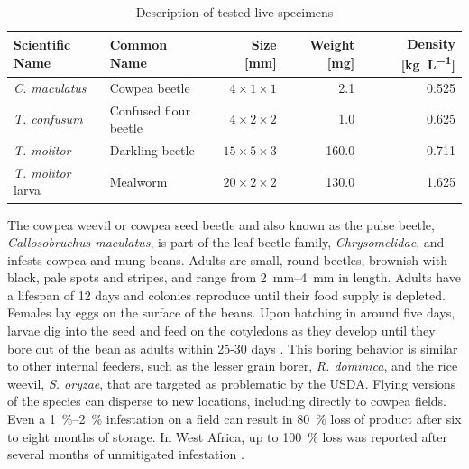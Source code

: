 \begin{table}[!htbp]
	\caption{Description of tested live specimens \label{tab:insects}}
	\centering
	\begin{tabular}{@{}llrrr@{}}
		\toprule
		\textbf{Scientific Name}  & \textbf{Common Name}  & \textbf{Size [\si{\milli\meter}]} & \textbf{Weight [\si{\milli\gram}]} & \textbf{Density [\si{\kilo\gram\per\liter}]} \\
		\midrule
		\textit{C. maculatus}     & Cowpea beetle         & \(4 \times 1 \times 1\)           & 2.1                                & 0.525                                        \\
		\textit{T. confusum}      & Confused flour beetle & \(4 \times 2 \times 2\)           & 1.0                                & 0.625                                        \\
		\textit{T. molitor}       & Darkling beetle       & \(15 \times 5 \times 3\)          & 160.0                              & 0.711                                        \\
		\textit{T. molitor} larva & Mealworm              & \(20 \times 2 \times 2\)          & 130.0                              & 1.625                                        \\
		\bottomrule
	\end{tabular}
\end{table}

The cowpea weevil or cowpea seed beetle and also known as the pulse beetle, \textit{Callosobruchus maculatus}, is part of the leaf beetle family, \textit{Chrysomelidae}, and infests cowpea and mung beans. Adults are small, round beetles, brownish with black, pale spots and stripes, and range from \SIrange{2}{4}{\milli\meter} in length. Adults have a lifespan of 12 days and colonies reproduce until their food supply is depleted. Females lay eggs on the surface of the beans. Upon hatching in around five days, larvae dig into the seed and feed on the cotyledons as they develop until they bore out of the bean as adults within 25-30 days \cite{tranConsequencesInbreedingCowpea1995}. This boring behavior is similar to other internal feeders, such as the lesser grain borer, \textit{R. dominica}, and the rice weevil, \textit{S. oryzae}, that are targeted as problematic by the USDA. Flying versions of the species can disperse to new locations, including directly to cowpea fields. Even a \SIrange{1}{2}{\percent} infestation on a field can result in \SI{80}{\percent} loss of product after six to eight months of storage. In West Africa, up to \SI{100}{\percent} loss was reported after several months of unmitigated infestation \cite{mohamedn.sallamInsectDamagePostHarvest2013}.

